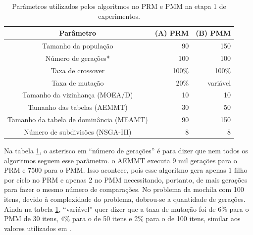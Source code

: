 \begin{table}[!htbp]
	\caption{Parâmetros utilizados pelos algoritmos no PRM e PMM na etapa 1 de experimentos.}
	\label{table_exp1_parametros}
	\begin{center}
		\begin{tabular}{c|r|r}
			\textbf{Parâmetro} & \textbf{(A) PRM} &  \textbf{(B) PMM} \\ %
			\hline
			Tamanho da população                    &    90 &      150 \\ %
			Número de gerações*                     &   100 &      100 \\ %
			Taxa de crossover                       & 100\% &    100\% \\ %
			Taxa de mutação                         &  20\% & variável \\ %
			Tamanho da vizinhança (MOEA/D)          &    10 &       10 \\ %
			Tamanho das tabelas (AEMMT)             &    30 &       50 \\ %
			Tamanho da tabela de dominância (MEAMT) &    90 &      150 \\ %
			Número de subdivisões (NSGA-III)        &     8 &        8 \\
			\hline
		\end{tabular}
	\end{center}
\end{table}

Na tabela \ref{table_exp1_parametros}, o asterisco em ``número de gerações'' é para dizer que nem todos os algoritmos seguem esse parâmetro. o AEMMT executa 9 mil gerações para o PRM e 7500 para o PMM. Isso acontece, pois esse algoritmo gera apenas 1 filho por ciclo no PRM e apenas 2 no PMM necessitando, portanto, de mais gerações para fazer o mesmo número de comparações. No problema da mochila com 100 itens, devido à complexidade do problema, dobrou-se a quantidade de gerações. Ainda na tabela \ref{table_exp1_parametros}, ``variável'' quer dizer que a taxa de mutação foi de 6\% para o PMM de 30 itens, 4\% para o de 50 itens e 2\% para o de 100 itens, similar aos valores utilizados em \cite{Ishibuchi2015}.

